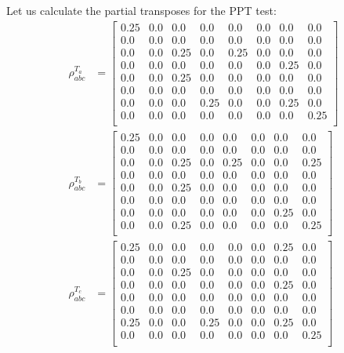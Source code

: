 \documentclass{scrartcl}
\begin{document}
    Let us calculate the partial transposes for the PPT test: 
    \begin{align*}
        \rho^{T_a}_{abc} &=
        \left[
        \begin{array}{cccccccc}
        0.25 & 0.0 & 0.0 & 0.0 & 0.0 & 0.0 & 0.0 & 0.0 \\
        0.0 & 0.0 & 0.0 & 0.0 & 0.0 & 0.0 & 0.0 & 0.0 \\
        0.0 & 0.0 & 0.25 & 0.0 & 0.25 & 0.0 & 0.0 & 0.0 \\
        0.0 & 0.0 & 0.0 & 0.0 & 0.0 & 0.0 & 0.25 & 0.0 \\
        0.0 & 0.0 & 0.25 & 0.0 & 0.0 & 0.0 & 0.0 & 0.0 \\
        0.0 & 0.0 & 0.0 & 0.0 & 0.0 & 0.0 & 0.0 & 0.0 \\
        0.0 & 0.0 & 0.0 & 0.25 & 0.0 & 0.0 & 0.25 & 0.0 \\
        0.0 & 0.0 & 0.0 & 0.0 & 0.0 & 0.0 & 0.0 & 0.25 \\
        \end{array}
        \right]\\  \rho^{T_b}_{abc} &=
        \left[
        \begin{array}{cccccccc}
        0.25 & 0.0 & 0.0 & 0.0 & 0.0 & 0.0 & 0.0 & 0.0 \\
        0.0 & 0.0 & 0.0 & 0.0 & 0.0 & 0.0 & 0.0 & 0.0 \\
        0.0 & 0.0 & 0.25 & 0.0 & 0.25 & 0.0 & 0.0 & 0.25 \\
        0.0 & 0.0 & 0.0 & 0.0 & 0.0 & 0.0 & 0.0 & 0.0 \\
        0.0 & 0.0 & 0.25 & 0.0 & 0.0 & 0.0 & 0.0 & 0.0 \\
        0.0 & 0.0 & 0.0 & 0.0 & 0.0 & 0.0 & 0.0 & 0.0 \\
        0.0 & 0.0 & 0.0 & 0.0 & 0.0 & 0.0 & 0.25 & 0.0 \\
        0.0 & 0.0 & 0.25 & 0.0 & 0.0 & 0.0 & 0.0 & 0.25 \\
        \end{array}
        \right]\\  \rho^{T_c}_{abc} &=
        \left[
        \begin{array}{cccccccc}
        0.25 & 0.0 & 0.0 & 0.0 & 0.0 & 0.0 & 0.25 & 0.0 \\
        0.0 & 0.0 & 0.0 & 0.0 & 0.0 & 0.0 & 0.0 & 0.0 \\
        0.0 & 0.0 & 0.25 & 0.0 & 0.0 & 0.0 & 0.0 & 0.0 \\
        0.0 & 0.0 & 0.0 & 0.0 & 0.0 & 0.0 & 0.25 & 0.0 \\
        0.0 & 0.0 & 0.0 & 0.0 & 0.0 & 0.0 & 0.0 & 0.0 \\
        0.0 & 0.0 & 0.0 & 0.0 & 0.0 & 0.0 & 0.0 & 0.0 \\
        0.25 & 0.0 & 0.0 & 0.25 & 0.0 & 0.0 & 0.25 & 0.0 \\
        0.0 & 0.0 & 0.0 & 0.0 & 0.0 & 0.0 & 0.0 & 0.25 \\
        \end{array}
        \right]
        \end{align*}
\end{document}
